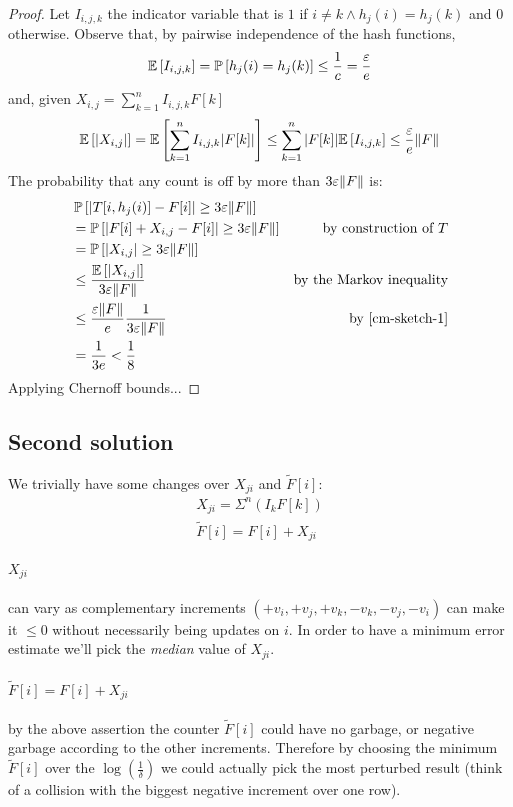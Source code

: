 \begin{proof}
  Let $I_{i,j,k}$ the indicator variable that is $1$ if $i \ne k \wedge h_j(i)=h_j(k)$ and $0$ otherwise. Observe that, by pairwise independence of the hash functions,
  $$\mathbb{E}\left[{I_{i,j,k}}\right] = \operatorname*{\mathbb{P}}\left[{h_j(i)=h_j(k)}\right] \leq \frac{1}{c} = \frac{\varepsilon}{e} $$
  and, given $X_{i,j}=\sum_{k=1}^n I_{i,j,k}F[k]$
  \begin{equation}
    \label{cm-sketch-1}
  	\mathbb{E}\left[{|X_{i,j}|}\right] = \mathbb{E}\left[{\sum_{k=1}^n I_{i,j,k}|F[k]|}\right] \leq \sum_{k=1}^n |F[k]|\mathbb{E}\left[{I_{i,j,k}}\right] \leq \frac{\varepsilon}{e}\lVert F\rVert
  \end{equation}
  The probability that any count is off by more than $3\varepsilon\lVert F\rVert$ is:
  \begin{align*}
    &  \operatorname*{\mathbb{P}}\left[{|T[i, h_j(i)]-F[i]| \geq 3\varepsilon\lVert F\rVert}\right] &  \\
    &= \operatorname*{\mathbb{P}}\left[{|F[i]+X_{i,j}-F[i]| \geq 3\varepsilon\lVert F\rVert}\right] & \text{by construction of $T$} \\
    &= \operatorname*{\mathbb{P}}\left[{|X_{i,j}| \geq 3\varepsilon\lVert F\rVert}\right] & \\
    &\leq \frac{\mathbb{E}\left[{|X_{i,j}|}\right]}{3\varepsilon\lVert F\rVert} & \text{by the Markov inequality} \\
    &\leq \frac{\varepsilon\lVert F\rVert}{e} \frac{1}{3\varepsilon\lVert F\rVert} & \text{by \eqref{cm-sketch-1}} \\
    &= \frac{1}{3e} < \frac{1}{8} &
  \end{align*}
  Applying Chernoff bounds...
\end{proof}

\subsection{Second solution}

We trivially have some changes over $X_{ji}$ and $\tilde{F}[i]$:
    \begin{gather*}
        X_{ji} = \Sigma^{n}(I_k F[k]) \\
        \tilde{F}[i] = F[i] + X_{ji}
    \end{gather*}
\label{X_ji}\paragraph{$X_{ji}$} can vary as complementary increments $(+v_i, +v_j, +v_k, -v_k, -v_j, -v_i)$
can make it $\leq 0$ without necessarily being updates on $i$.
In order to have a minimum error estimate we'll pick the \emph{median} value of $X_{ji}$.
\label{f_tilde}~\paragraph{$\tilde{F}[i] = F[i] + X_{ji}$} by the above assertion the counter $\tilde{F}[i]$ could have no garbage, or negative
garbage according to the other increments.
Therefore by choosing the minimum $\tilde{F}[i]$ over the $\log(\frac{1}{\delta})$ we
could actually pick the most perturbed result (think of a collision with the
biggest negative increment over one row).

